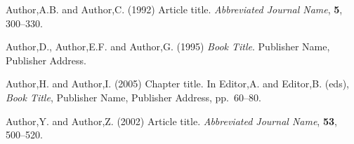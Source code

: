 \documentclass[a4,center,fleqn]{NAR}
\begin{document}
\begin{thebibliography}{4}

Author,A.B. and Author,C. (1992)
Article title.
\textit{Abbreviated Journal Name}, \textbf{5}, 300--330.

Author,D., Author,E.F. and Author,G. (1995)
\textit{Book Title}.
Publisher Name, Publisher Address.

Author,H. and Author,I. (2005)
Chapter title.
In
Editor,A. and Editor,B. (eds),
\textit{Book Title},
Publisher Name, Publisher Address,
pp.\ 60--80.

Author,Y. and Author,Z. (2002)
Article title.
\textit{Abbreviated Journal Name}, \textbf{53}, 500--520.

\end{thebibliography}
\end{document}
